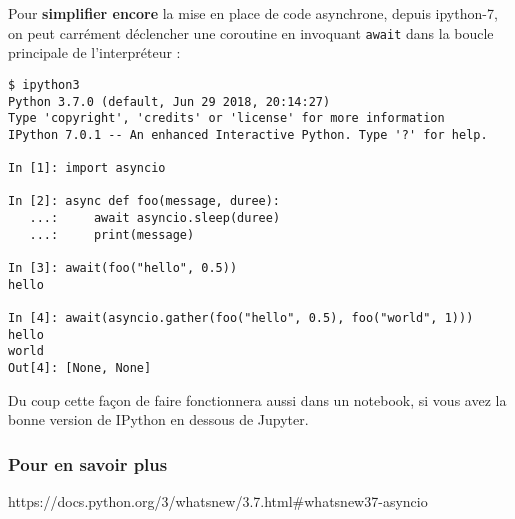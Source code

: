     Pour \textbf{simplifier encore} la mise en place de code asynchrone,
depuis ipython-7, on peut carrément déclencher une coroutine en
invoquant \texttt{await} dans la boucle principale de l'interpréteur :

    \begin{verbatim}
$ ipython3
Python 3.7.0 (default, Jun 29 2018, 20:14:27)
Type 'copyright', 'credits' or 'license' for more information
IPython 7.0.1 -- An enhanced Interactive Python. Type '?' for help.

In [1]: import asyncio

In [2]: async def foo(message, duree):
   ...:     await asyncio.sleep(duree)
   ...:     print(message)

In [3]: await(foo("hello", 0.5))
hello

In [4]: await(asyncio.gather(foo("hello", 0.5), foo("world", 1)))
hello
world
Out[4]: [None, None]
\end{verbatim}

    Du coup cette façon de faire fonctionnera aussi dans un notebook, si
vous avez la bonne version de IPython en dessous de Jupyter.

    \hypertarget{pour-en-savoir-plus}{%
\subsubsection{Pour en savoir plus}\label{pour-en-savoir-plus}}

https://docs.python.org/3/whatsnew/3.7.html\#whatsnew37-asyncio


    
    
    
